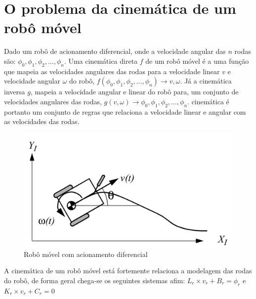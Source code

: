 
\label{Cap:Teoria}

\section{O problema da cinemática de um robô móvel}
Dado um robô de acionamento diferencial, onde a velocidade
angular das $n$ rodas são: $\phi_0,\phi_1,\phi_2,...,\phi_n$.
Uma cinemática direta $f$ de um robô móvel é a uma função que mapeia as velocidades
angulares das rodas para a velocidade linear $v$ e velocidade angular $\omega$
do robô, $f(\phi_0,\phi_1,\phi_2,...,\phi_n) \rightarrow v,\omega$. Já
a cinemática inversa $g$, mapeia a velocidade angular e linear do robô para, um
conjunto de velocidades angulares das rodas, $g(v,\omega) \rightarrow  \phi_0,\phi_1,\phi_2,...,\phi_n$.
cinemática é portanto um conjunto de regras que relaciona a velocidade linear e angular
com as velocidades das rodas.

\begin{figure}[H]
    \centering
    \includegraphics[scale=0.9]{figuras/robo.png}
    \caption[]{Robô móvel com acionamento diferencial}
\end{figure}

A cinemática de um robô móvel está fortemente relaciona a modelagem
das rodas do robô, de forma geral chega-se os seguintes sistemas
afim: $L_r\times v_r +B_r = \phi_r$ e $K_r \times v_r + C_r = 0$

